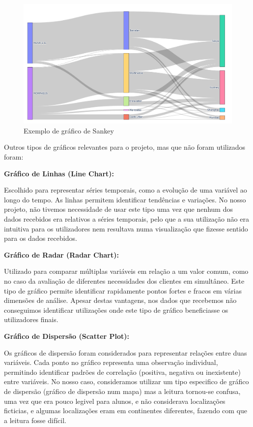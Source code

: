 \begin{figure}[H]
    \centering
    \includegraphics[max width=12cm, keepaspectratio]{./img/skankey}
    \caption{Exemplo de gráfico de Sankey}
\end{figure}
\noindent

Outros tipos de gráficos relevantes para o projeto, mas que não foram utilizados foram:

\textbf{Gráfico de Linhas (Line Chart):}  

Escolhido para representar séries temporais, como a evolução de uma variável ao longo do tempo. As linhas permitem identificar tendências e variações. No nosso projeto, não tivemos necessidade de usar este tipo uma vez que nenhum dos dados recebidos era relativos a séries temporais, pelo que a sua utilização não era intuitiva para os utilizadores nem resultava numa visualização que fizesse sentido para os dados recebidos.

\textbf{Gráfico de Radar (Radar Chart):}  

Utilizado para comparar múltiplas variáveis em relação a um valor comum, como no caso da avaliação de diferentes necessidades dos clientes em simultâneo. Este tipo de gráfico permite identificar rapidamente pontos fortes e fracos em várias dimensões de análise. Apesar destas vantagens, nos dados que recebemos não conseguimos identificar utilizações onde este tipo de gráfico beneficiasse os utilizadores finais.

\textbf{Gráfico de Dispersão (Scatter Plot):}

Os gráficos de dispersão foram considerados para representar relações entre duas variáveis. Cada ponto no gráfico representa uma observação individual, permitindo identificar padrões de correlação (positiva, negativa ou inexistente) entre variáveis. No nosso caso, consideramos utilizar um tipo especifico de gráfico de dispersão (gráfico de dispersão num mapa) mas a leitura tornou-se confusa, uma vez que era pouco legivel para alunos, e não considerava localizações ficticias, e algumas localizações eram em continentes diferentes, fazendo com que a leitura fosse difícil.

